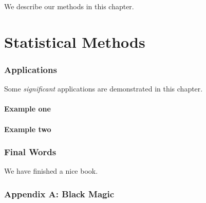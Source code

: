 \documentclass[]{scrartcl}
\begin{document}
We describe our methods in this chapter.

\hypertarget{part-statistical-methods}{%
\part{Statistical Methods}\label{part-statistical-methods}}

\hypertarget{applications}{%
\section{Applications}\label{applications}}

Some \emph{significant} applications are demonstrated in this chapter.

\hypertarget{example-one}{%
\subsection{Example one}\label{example-one}}

\hypertarget{example-two}{%
\subsection{Example two}\label{example-two}}

\hypertarget{final-words}{%
\section{Final Words}\label{final-words}}

We have finished a nice book.

\hypertarget{refs}{}

\hypertarget{appendix-appendices}{%
\appendix}


\hypertarget{appendix-a-black-magic}{%
\section{Appendix A: Black Magic}\label{appendix-a-black-magic}}


\end{document}
